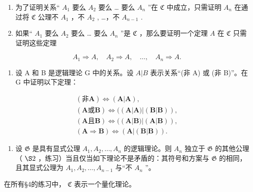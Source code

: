 \begin{enumerate}
\def\labelenumi{(\alph{enumi})}
\item
  为了证明关系“ \(A_{1}\) 要么 \(A_{2}\) 要么 \ldots{} 要么 \(A_{n}\) ”在 \(\mathfrak{C}\) 中成立，只需证明 \(A_{n}\) 在通过将 \(\mathfrak{C}\) 公理不 \(A_{1}\) ，不 \(A_{2}\) , \ldots，不 \(A_{n-1}\) .
\item
  如果“ \(A_{1}\) 要么 \(A_{2}\) 要么 \ldots{} 要么 \(A_{n}\) ”是 \(\mathfrak{C}\) ，那么要证明一个定理 \(A\) 在 \(\mathfrak{C}\) 只需证明这些定理
\end{enumerate}

\[
A _ {1} \Longrightarrow A, \quad A _ {2} \Longrightarrow A, \quad \dots , \quad A _ {n} \Longrightarrow A.
\]

\begin{enumerate}
\def\labelenumi{\arabic{enumi}.}
\setcounter{enumi}{3}
\tightlist
\item
  设 A 和 B 是逻辑理论 G 中的关系。设 \(A|B\) 表示关系“(非 A) 或 (非 B)”。在 G 中证明以下定理：
\end{enumerate}

\[
\begin{array}{c} (\text {非} \boldsymbol {A}) \Longleftrightarrow (\boldsymbol {A} | \boldsymbol {A}), \\ (\boldsymbol {A} \text {或} \boldsymbol {B}) \Longleftrightarrow ((\boldsymbol {A} | \boldsymbol {A}) | (\boldsymbol {B} | \boldsymbol {B})), \\ (\boldsymbol {A} \text {且} \boldsymbol {B}) \Longleftrightarrow ((\boldsymbol {A} | \boldsymbol {B}) | (\boldsymbol {A} | \boldsymbol {B})), \\ (\boldsymbol {A} \Longrightarrow \boldsymbol {B}) \Longleftrightarrow (\boldsymbol {A} | (\boldsymbol {B} | \boldsymbol {B})). \end{array}
\]

\begin{enumerate}
\def\labelenumi{\arabic{enumi}.}
\setcounter{enumi}{4}
\tightlist
\item
  设 \(\mathfrak{G}\) 是具有显式公理 \(A_{1}, A_{2}, \ldots, A_{n}\) 的逻辑理论。则 \(A_{n}\) 独立于 \(\mathfrak{G}\) 的其他公理（ \(\S 2\) ，练习）当且仅当如下理论不是矛盾的：其符号和方案与 \(\mathfrak{G}\) 的相同，且其显式公理为 \(A_{1}, A_{2}, \ldots, A_{n-1}\) 与``不 \(A_{n}\) ''。
\end{enumerate}

\exercisegroup

在所有§4的练习中， \(\mathfrak{C}\) 表示一个量化理论。

